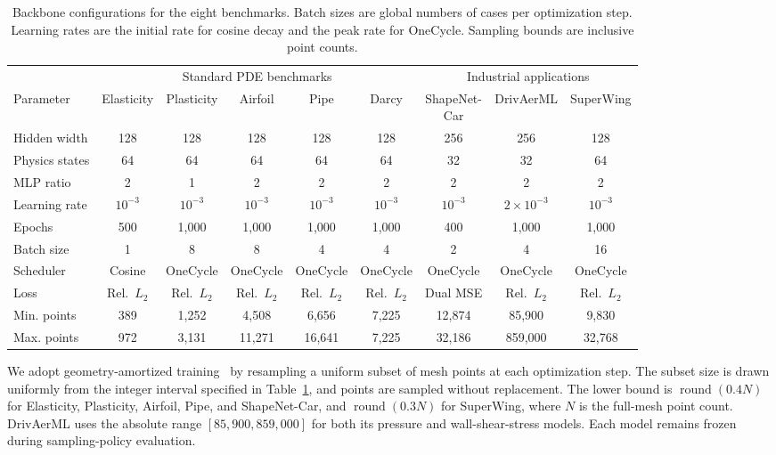 \documentclass{article}
\begin{document}
\begin{table}[!htbp]
    \centering
    \footnotesize
    \caption{Backbone configurations for the eight benchmarks. Batch sizes are global numbers of cases per optimization step. Learning rates are the initial rate for cosine decay and the peak rate for OneCycle. Sampling bounds are inclusive point counts.}
    \label{tab:training_details}
    \setlength{\tabcolsep}{2.3pt}
    \renewcommand{\arraystretch}{1.18}
    \begin{tabular*}{\textwidth}{@{\extracolsep{\fill}}lcccccccc@{}}
        \toprule
        & \multicolumn{5}{c}{Standard PDE benchmarks} & \multicolumn{3}{c}{Industrial applications} \\
        \cmidrule(lr){2-6}\cmidrule(lr){7-9}
        Parameter & Elasticity & Plasticity & Airfoil & Pipe & Darcy
        & \shortstack{ShapeNet-\\Car} & DrivAerML & SuperWing \\
        \midrule
        Hidden width & 128 & 128 & 128 & 128 & 128 & 256 & 256 & 128 \\
        Physics states & 64 & 64 & 64 & 64 & 64 & 32 & 32 & 64 \\
        MLP ratio & 2 & 1 & 2 & 2 & 2 & 2 & 2 & 2 \\
        \midrule
        Learning rate & $10^{-3}$ & $10^{-3}$ & $10^{-3}$ & $10^{-3}$ & $10^{-3}$ & $10^{-3}$ & $2\!\times\!10^{-3}$ & $10^{-3}$ \\
        Epochs & 500 & 1,000 & 1,000 & 1,000 & 1,000 & 400 & 1,000 & 1,000 \\
        Batch size & 1 & 8 & 8 & 4 & 4 & 2 & 4 & 16 \\
        Scheduler & Cosine & OneCycle & OneCycle & OneCycle & OneCycle & OneCycle & OneCycle & OneCycle \\
        Loss & Rel.\ $L_2$ & Rel.\ $L_2$ & Rel.\ $L_2$ & Rel.\ $L_2$ & Rel.\ $L_2$ & Dual MSE & Rel.\ $L_2$ & Rel.\ $L_2$ \\
        \midrule
        Min. points & 389 & 1,252 & 4,508 & 6,656 & 7,225 & 12,874 & 85,900 & 9,830 \\
        Max. points & 972 & 3,131 & 11,271 & 16,641 & 7,225 & 32,186 & 859,000 & 32,768 \\
        \bottomrule
    \end{tabular*}
\end{table}


We adopt geometry-amortized training~\citep{zhou2026transolver3} by resampling a uniform subset of mesh points at each optimization step. The subset size is drawn uniformly from the integer interval specified in Table~\ref{tab:training_details}, and points are sampled without replacement. The lower bound is $\operatorname{round}(0.4N)$ for Elasticity, Plasticity, Airfoil, Pipe, and ShapeNet-Car, and $\operatorname{round}(0.3N)$ for SuperWing, where $N$ is the full-mesh point count. DrivAerML uses the absolute range $[85{,}900,859{,}000]$ for both its pressure and wall-shear-stress models. Each model remains frozen during sampling-policy evaluation.
\end{document}
